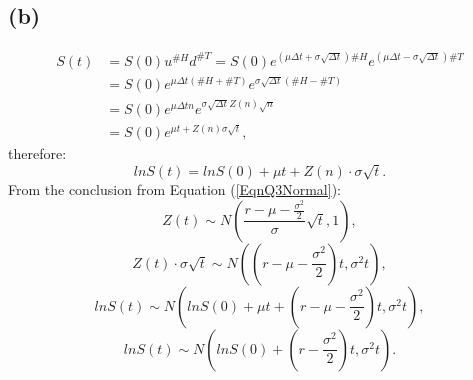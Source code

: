 \documentclass[final,3p,times]{elsarticle}
\begin{document}
	\subsection{(b)}
		\begin{equation}
			\begin{split}
				S(t)&=S(0) u^{\#H} d^{\#T}=S(0) e^{\left(\mu \Delta t + \sigma \sqrt{\Delta t}\right)\#H} e^{\left(\mu \Delta t - \sigma \sqrt{\Delta t}\right)\#T} \\
				&=S(0) e^{\mu \Delta t \left(\#H+\#T\right) } e^{\sigma \sqrt{\Delta t} \left(\#H-\#T\right) } \\
				&=S(0) e^{\mu \Delta t n } e^{\sigma \sqrt{\Delta t} Z(n) \sqrt{n} } \\
				&=S(0) e^{\mu t + Z(n) \sigma \sqrt{t}}
				,
			\end{split}
		\end{equation}
		therefore:
		\begin{equation}
			ln S(t) = ln S(0) + \mu t + Z(n) \cdot \sigma \sqrt{t}
			.
		\end{equation}
		From the conclusion from Equation (\ref{EqnQ3Normal}):
		\begin{equation*}
			Z(t) \sim N\left(\frac{r-\mu-\frac{\sigma^2}{2}}{\sigma} \sqrt{t},1\right)
			,
		\end{equation*}
		\begin{equation*}
			Z(t) \cdot \sigma \sqrt{t} \sim N\left(\left(r-\mu-\frac{\sigma^2}{2}\right) t,\sigma^2 t\right)
			,
		\end{equation*}
		\begin{equation*}
			ln S(t) \sim N\left(ln S(0)+\mu t+\left(r-\mu-\frac{\sigma^2}{2}\right) t,\sigma^2 t\right)
			,
		\end{equation*}
		\begin{equation}
			ln S(t) \sim N\left(ln S(0)+\left(r-\frac{\sigma^2}{2}\right) t,\sigma^2 t\right)
			.
		\end{equation}
		
\end{document}
